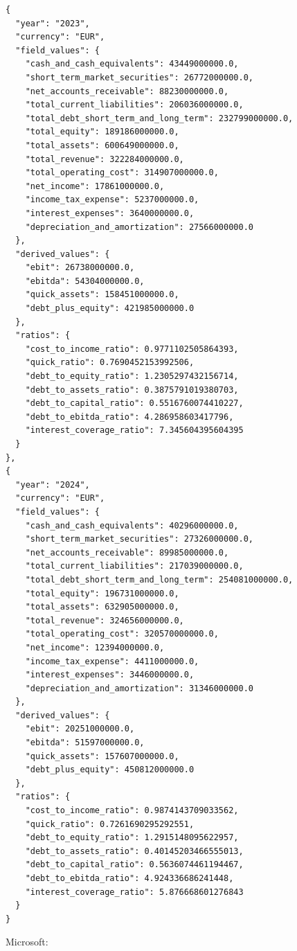 \documentclass[12pt,a4paper]{article}
\begin{document}
\begin{lstlisting}[style=json, caption={Calculated financial ratios for Volkswagen (FY\,2023--2024)}, label=lst:ratios_volkswagen]
{
  "year": "2023",
  "currency": "EUR",
  "field_values": {
    "cash_and_cash_equivalents": 43449000000.0,
    "short_term_market_securities": 26772000000.0,
    "net_accounts_receivable": 88230000000.0,
    "total_current_liabilities": 206036000000.0,
    "total_debt_short_term_and_long_term": 232799000000.0,
    "total_equity": 189186000000.0,
    "total_assets": 600649000000.0,
    "total_revenue": 322284000000.0,
    "total_operating_cost": 314907000000.0,
    "net_income": 17861000000.0,
    "income_tax_expense": 5237000000.0,
    "interest_expenses": 3640000000.0,
    "depreciation_and_amortization": 27566000000.0
  },
  "derived_values": {
    "ebit": 26738000000.0,
    "ebitda": 54304000000.0,
    "quick_assets": 158451000000.0,
    "debt_plus_equity": 421985000000.0
  },
  "ratios": {
    "cost_to_income_ratio": 0.9771102505864393,
    "quick_ratio": 0.7690452153992506,
    "debt_to_equity_ratio": 1.2305297432156714,
    "debt_to_assets_ratio": 0.3875791019380703,
    "debt_to_capital_ratio": 0.5516760074410227,
    "debt_to_ebitda_ratio": 4.286958603417796,
    "interest_coverage_ratio": 7.345604395604395
  }
},
{
  "year": "2024",
  "currency": "EUR",
  "field_values": {
    "cash_and_cash_equivalents": 40296000000.0,
    "short_term_market_securities": 27326000000.0,
    "net_accounts_receivable": 89985000000.0,
    "total_current_liabilities": 217039000000.0,
    "total_debt_short_term_and_long_term": 254081000000.0,
    "total_equity": 196731000000.0,
    "total_assets": 632905000000.0,
    "total_revenue": 324656000000.0,
    "total_operating_cost": 320570000000.0,
    "net_income": 12394000000.0,
    "income_tax_expense": 4411000000.0,
    "interest_expenses": 3446000000.0,
    "depreciation_and_amortization": 31346000000.0
  },
  "derived_values": {
    "ebit": 20251000000.0,
    "ebitda": 51597000000.0,
    "quick_assets": 157607000000.0,
    "debt_plus_equity": 450812000000.0
  },
  "ratios": {
    "cost_to_income_ratio": 0.9874143709033562,
    "quick_ratio": 0.7261690295292551,
    "debt_to_equity_ratio": 1.2915148095622957,
    "debt_to_assets_ratio": 0.40145203466555013,
    "debt_to_capital_ratio": 0.5636074461194467,
    "debt_to_ebitda_ratio": 4.924336686241448,
    "interest_coverage_ratio": 5.876668601276843
  }
}
\end{lstlisting}

Microsoft:
\end{document}
